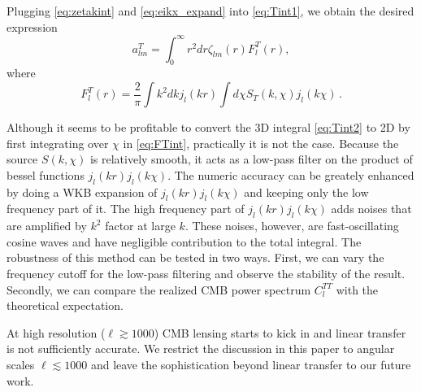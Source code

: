 Plugging \eqref{eq:zetakint} and \eqref{eq:eikx_expand} into \eqref{eq:Tint1}, we obtain the desired expression
\begin{equation}
a_{lm}^T = \int_0^\infty r^2dr \zeta_{lm}(r) F^T_l(r), \label{eq:Tint2}
\end{equation}
where
\begin{equation}
F^T_l(r) = \frac{2}{\pi} \int k^2dk j_l(kr) \int d\chi S_T(k, \chi) j_l(k\chi) \, . \label{eq:FTint}
\end{equation}

Although it seems to be profitable to convert the 3D integral \eqref{eq:Tint2} to 2D by first integrating over $\chi$ in \eqref{eq:FTint}, practically it is not the case. Because the source $S(k, \chi)$ is relatively smooth, it acts as a low-pass filter on the product of bessel functions $j_l(kr)j_l(k\chi)$. The numeric accuracy can be greately enhanced by doing a WKB expansion of $j_l(kr)j_l(k\chi)$ and keeping only the low frequency part of it. The high frequency part of $j_l(kr)j_l(k\chi)$ adds noises that are amplified by $k^2$ factor at large $k$. These noises, however, are fast-oscillating cosine waves and have negligible contribution to the total integral. The robustness of this method can be tested in two ways. First, we can vary the frequency cutoff for the low-pass filtering and observe the stability of the result. Secondly, we can compare the realized CMB power spectrum $C_l^{TT}$ with the theoretical expectation. 

At high resolution ($\ell \gtrsim 1000$) CMB lensing starts to kick in and linear transfer is not sufficiently accurate. We restrict the discussion in this paper to angular scales $\ell \lesssim 1000$ and leave the sophistication beyond linear transfer to our future work.



